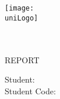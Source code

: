 \begin{titlepage}

    
    \newcommand{\thesisTitle}{
        Thesis ENG title
    }
    
    \newcommand{\thesisTitleEST}{Thesis EST title}
    
    \begin{flushleft}
        \texttt{[image: \\uniLogo]}
    
    
    \end{flushleft}
    
    
        \begin{center}
            
    
            \vspace*{4cm}
            
            {
                { \textbf{\reportTitle}} \\
                \vspace*{0.5cm}
                { \textbf{\courseCode}} \\
                \vspace*{0.7cm}
                { REPORT}
            }
    
            \vspace{1.5cm}
    
            \begin{flushright}
                Student: {\it \studentName} \\
                Student Code: {\it \studentCode} \\
            \end{flushright}
    
            \vspace*{9cm}
    
            \city \ \the\year{}
    
        \end{center}
    \end{titlepage}
